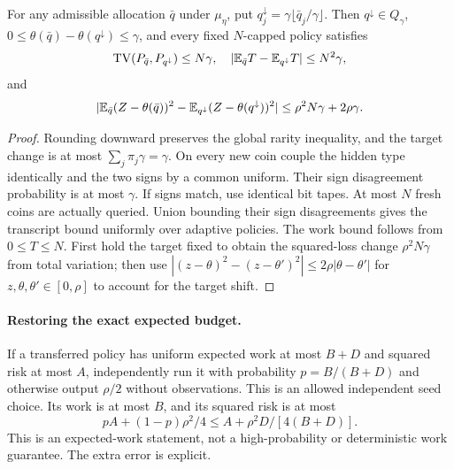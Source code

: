 \begin{lemma}
For any admissible allocation $\bar q$ under $\mu_\eta$, put
$q_j^\downarrow=\gamma\lfloor\bar q_j/\gamma\rfloor$. Then
$q^\downarrow\in Q_\gamma$,
$0\le\theta(\bar q)-\theta(q^\downarrow)\le\gamma$, and every fixed
$N$-capped policy satisfies
\[
 \operatorname{TV}(P_{\bar q},P_{q^\downarrow})\le N\gamma,
 \quad |\mathbb E_{\bar q}T-\mathbb E_{q^\downarrow}T|\le N^2\gamma,
\]
and
\[
 |\mathbb E_{\bar q}(Z-\theta(\bar q))^2
       -\mathbb E_{q^\downarrow}(Z-\theta(q^\downarrow))^2|
       \le\rho^2N\gamma+2\rho\gamma.
\]
\end{lemma}
\begin{proof}
Rounding downward preserves the global rarity inequality, and the target
change is at most $\sum_j\pi_j\gamma=\gamma$. On every new coin couple the
hidden type identically and the two signs by a common uniform. Their sign
disagreement probability is at most $\gamma$. If signs match, use identical
bit tapes. At most $N$ fresh coins are actually queried. Union bounding their
sign disagreements gives the transcript bound uniformly over adaptive
policies. The work bound follows from $0\le T\le N$. First hold the target
fixed to obtain the squared-loss change $\rho^2N\gamma$ from total variation;
then use $|(z-\theta)^2-(z-\theta')^2|\le2\rho|\theta-\theta'|$ for
$z,\theta,\theta'\in[0,\rho]$ to account for the target shift.
\end{proof}

\paragraph{Restoring the exact expected budget.}
If a transferred policy has uniform expected work at most $B+D$ and squared
risk at most $A$, independently run it with probability $p=B/(B+D)$ and
otherwise output $\rho/2$ without observations. This is an allowed independent
seed choice. Its work is at most $B$, and its squared risk is at most
\[
 pA+(1-p)\rho^2/4\le A+\rho^2D/[4(B+D)].                 \tag{2}
\]
This is an expected-work statement, not a high-probability or deterministic
work guarantee. The extra error is explicit.

